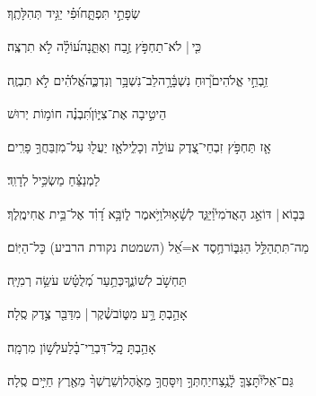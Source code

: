 \documentclass[12pt]{article}
\newcommand{\loc}[1]{\textsuperscript{\locf{#1}}}
\begin{document}
{\loc{ יז}~}‏ שְׂפָתַ֣י תִּפְתָּ֑ח{\hfill}וּ֝פִ֗י יַגִּ֥יד תְּהִלָּתֶֽךָ׃\par

{\loc{ יח}~}‏כִּ֤י |  לֹא־תַחְפֹּ֣ץ זֶ֣בַח וְאֶתֵּ֑נָה{\hfill}ע֝וֹלָ֗ה לֹ֣א תִרְצֶֽה׃\par

{\loc{ יט}~}‏זִ֥בְחֵ֣י אֱלֹהִים֮{\hfill}ר֤וּחַ נִשְׁבָּ֫רָ֥ה\newline\hspace*{.5em}לֵב־נִשְׁבָּ֥ר וְנִדְכֶּ֑ה{\hfill}אֱ֝לֹהִ֗ים לֹ֣א תִבְזֶֽה׃\par

{\loc{ כ}~}‏הֵיטִ֣יבָה  אֶת־צִיּ֑וֹן{\hfill}תִּ֝בְנֶ֗ה חוֹמ֥וֹת יְרוּשׁ\par

{\loc{ כא}~}‏אָ֤ז תַּחְפֹּ֣ץ זִבְחֵי־צֶ֭דֶק עוֹלָ֣ה וְכָלִ֑יל{\hfill}אָ֤ז יַעֲל֖וּ עַל־מִזְבַּחֲךָ֣ פָרִֽים׃\par\pend
\ledpb
\pstart[\subsection*{\textcolor{red}{פרק נב}}]\label{פרק נב}
{\loc{ א}~}‏לַמְנַצֵּ֗חַ מַשְׂכִּ֥יל לְדָוִֽד׃\par

{\loc{ ב}~}‏בְּב֤וֹא |  דּוֹאֵ֣ג הָאֲדֹמִי֮{\hfill}וַיַּגֵּ֢ד לְשָׁ֫א֥וּל\newline\hspace*{.5em}וַיֹּ֥אמֶר ל֑וֹ{\hfill}בָּ֥א דָ֝וִ֗ד אֶל־בֵּ֥ית אֲחִימֶֽלֶךְ׃\par

{\loc{ ג}~}‏מַה־תִּתְהַלֵּ֣ל  הַגִּבּ֑וֹר{\hfill}חֶ֥סֶד א=אֵ֝ל (השמטת נקודת הרביע) כׇּל־הַיּֽוֹם׃\par

{\loc{ ד}~}‏ תַּחְשֹׁ֣ב לְשׁוֹנֶ֑ךָ{\hfill}כְּתַ֥עַר מְ֝לֻטָּ֗שׁ עֹשֵׂ֥ה רְמִיָּֽה׃\par

{\loc{ ה}~}‏אָהַ֣בְתָּ רָּ֣ע מִטּ֑וֹב{\hfill}שֶׁ֓קֶר |  מִדַּבֵּ֖ר צֶ֣דֶק סֶֽלָה׃\par

{\loc{ ו}~}‏אָהַ֥בְתָּ כׇֽל־דִּבְרֵי־בָ֗לַע{\hfill}לְשׁ֣וֹן מִרְמָֽה׃\par

{\loc{ ז}~}‏גַּם־אֵל֮{\hfill}יִתׇּצְךָ֢ לָ֫נֶ֥צַח\newline\hspace*{.5em}יַחְתְּךָ֣ וְיִסָּחֲךָ֣ מֵאֹ֑הֶל{\hfill}וְשֵׁרֶשְׁךָ֨ מֵאֶ֖רֶץ חַיִּ֣ים סֶֽלָה׃\par
\end{document}
